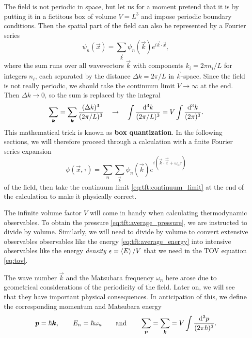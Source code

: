 The field is not periodic in space, but let us for a moment pretend that it is by putting it in a fictitous box of volume $V = L^3$ and impose periodic boundary conditions.
Then the spatial part of the field can also be represented by a Fourier series
\begin{equation}
	\psi_n(\vec{x}) = \sum_\vec{k} \psi_n(\vec{k}) e^{i \vec{k} \cdot \vec{x}} ,
\end{equation}
where the sum runs over all wavevectors $\vec{k}$ with components $k_i = 2 \pi n_i / L$ for integers $n_i$, each separated by the distance $\Delta k = 2 \pi / L$ in $\vec{k}$-space.
Since the field is not really periodic, we should take the continuum limit $V \rightarrow \infty$ at the end.
Then $\Delta k \rightarrow 0$, so the sum is replaced by the integral
\begin{equation}
	\sum_{\bm{k}} = 
	\sum_{\bm{k}} \frac{(\Delta k)^3}{(2 \pi / L)^3} 
	\quad \rightarrow  \quad
	\int \frac{\mathop{}\!\mathrm{d}^3 k}{(2 \pi / L)^3} =
	V \int \frac{\mathop{}\!\mathrm{d}^3 k}{(2 \pi)^3} .
\label{eq:tft:continuum_limit}
\end{equation}
This mathematical trick is known as \textbf{box quantization}.
In the following sections, we will therefore proceed through a calculation with a finite Fourier series expansion
\begin{equation}
	\psi(\vec{x}, \tau) = \sum_n \sum_\vec{k} \psi_n(\vec{k}) e^{i (\vec{k} \cdot \vec{\vec{x}} + \omega_n \tau)}
\label{eq:tft:fourier_series}
\end{equation}
of the field, then take the continuum limit \eqref{eq:tft:continuum_limit} at the end of the calculation to make it physically correct.

The infinite volume factor $V$ will come in handy when calculating thermodynamic observables.
To obtain the pressure \eqref{eq:tft:average_pressure}, we are instructed to divide by volume.
Similarly, we will need to divide by volume to convert extensive observables observables like the energy \eqref{eq:tft:average_energy} into intensive observables like the energy \emph{density} $\epsilon = \left< E \right> / V$ that we need in the TOV equation \eqref{eq:tov}.

The wave number $\vec{k}$ and the Matsubara frequency $\omega_n$ here arose due to geometrical considerations of the periodicity of the field.
Later on, we will see that they have important physical consequences.
In anticipation of this, we define the corresponding momentum and Matsubara energy
\begin{equation}
	{\bm{p}} = \hbar {\bm{k}}, \qquad
	E_n = \hbar \omega_n \qquad \text{and} \qquad
	\sum_{\bm{p}} = \sum_{\bm{k}} = V \int \frac{\mathop{}\!\mathrm{d}^3 p}{(2 \pi \hbar)^3}.
\label{eq:tft:matsubara_energies}
\end{equation}

